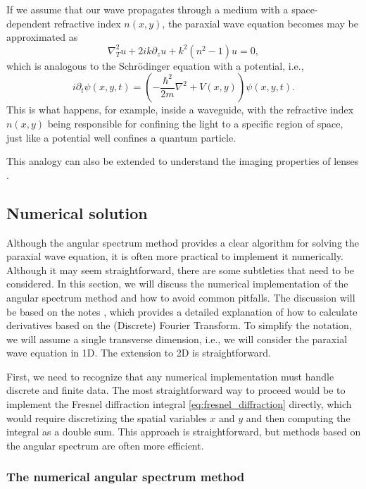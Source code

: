 \documentclass[openany,a4paper,oneside,11pt]{article}
\begin{document}
If we assume that our wave propagates through a medium with a space-dependent refractive index $n(x,y)$, the paraxial wave equation becomes may be approximated as
\begin{equation}
    \nabla^2_T u + 2ik \partial_z u + k^2(n^2 - 1) u = 0,
\end{equation}
which is analogous to the Schrödinger equation with a potential, i.e.,
\begin{equation}
    i \partial_t \psi(x, y, t) = \left( -\frac{\hbar^2}{2m} \nabla^2 + V(x,y) \right) \psi(x, y, t).
\end{equation}
This is what happens, for example, inside a waveguide, with the refractive index $n(x,y)$ being responsible for confining the light to a specific region of space, just like a potential well confines a quantum particle.

This analogy can also be extended to understand the imaging properties of lenses \cite{stoler1981operator}.

\subsection{Numerical solution}

Although the angular spectrum method provides a clear algorithm for solving the paraxial wave equation, it is often more practical to implement it numerically. Although it may seem straightforward, there are some subtleties that need to be considered. In this section, we will discuss the numerical implementation of the angular spectrum method and how to avoid common pitfalls. The discussion will be based on the notes \cite{fftderiv}, which provides a detailed explanation of how to calculate derivatives based on the (Discrete) Fourier Transform. To simplify the notation, we will assume a single transverse dimension, i.e., we will consider the paraxial wave equation in 1D. The extension to 2D is straightforward. 

First, we need to recognize that any numerical implementation must handle discrete and finite data. The most straightforward way to proceed would be to implement the Fresnel diffraction integral \eqref{eq:fresnel_diffraction} directly, which would require discretizing the spatial variables $x$ and $y$ and then computing the integral as a double sum. This approach is straightforward, but methods based on the angular spectrum are often more efficient.

\subsubsection{The numerical angular spectrum method}
\end{document}
